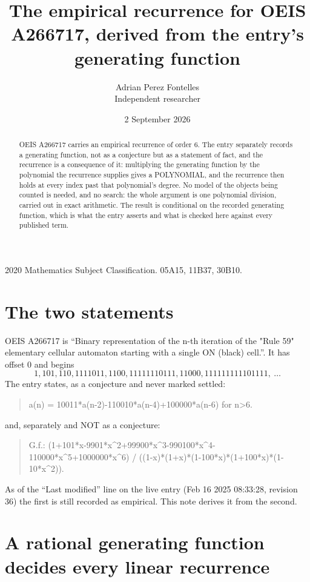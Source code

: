 \documentclass[11pt,a4paper]{article}
\title{The empirical recurrence for OEIS A266717, derived from the entry's generating function}
\author{Adrian Perez Fontelles\\ \small Independent researcher}
\date{2 September 2026}
\theoremstyle{plain}
\theoremstyle{definition}
\begin{document}
\maketitle

\begin{abstract}
OEIS A266717 carries an empirical recurrence of order $6$. The entry separately records a
generating function, not as a conjecture but as a statement of fact, and the recurrence is a
consequence of it: multiplying the generating function by the polynomial the recurrence
supplies gives a POLYNOMIAL, and the recurrence then holds at every index past that
polynomial's degree. No model of the objects being counted is needed, and no search: the
whole argument is one polynomial division, carried out in exact arithmetic. The result is
conditional on the recorded generating function, which is what the entry asserts and what is
checked here against every published term.
\end{abstract}

\noindent\small 2020 Mathematics Subject Classification. 05A15, 11B37, 30B10.\normalsize

\section{The two statements}

OEIS A266717 is ``Binary representation of the n-th iteration of the "Rule 59" elementary cellular automaton starting with a single ON (black) cell.''. It has offset $0$ and begins
\[
1, 101, 110, 1111011, 1100, 11111110111, 11000, 111111111101111,\ \dots
\]
The entry states, as a conjecture and never marked settled:
\begin{quote}
a(n) = 10011*a(n-2)-110010*a(n-4)+100000*a(n-6) for n>6.
\end{quote}
and, separately and NOT as a conjecture:
\begin{quote}
G.f.: (1+101*x-9901*x\^{}2+99900*x\^{}3-990100*x\^{}4-110000*x\^{}5+1000000*x\^{}6) / ((1-x)*(1+x)*(1-100*x)*(1+100*x)*(1-10*x\^{}2)).
\end{quote}
As of the ``Last modified'' line on the live entry (Feb 16 2025 08:33:28, revision 36) the first is still
recorded as empirical. This note derives it from the second.

\section{A rational generating function decides every linear recurrence}
\end{document}
